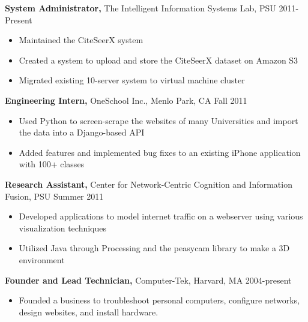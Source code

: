 \documentclass[margin]{res}
\begin{document}
\begin{resume}
{\bf System Administrator,} The Intelligent Information Systems Lab, PSU \hfill 2011-Present
\begin{itemize} \itemsep -2pt  %
\item Maintained the CiteSeerX system 
\item Created a system to upload and store the CiteSeerX dataset on Amazon S3
\item Migrated existing 10-server system to virtual machine cluster 
\end{itemize}
 
{\bf Engineering Intern,} OneSchool Inc., Menlo Park, CA \hfill Fall 2011
\begin{itemize} \itemsep -2pt %
\item Used Python to screen-scrape the websites of many Universities and import the data into a Django-based API
\item Added features and implemented bug fixes to an existing iPhone application with 100+ classes
\end{itemize}

{\bf Research Assistant,} Center for Network-Centric Cognition and Information Fusion, PSU \hfill Summer 2011
\begin{itemize} \itemsep -2pt
\item Developed applications to model internet traffic on a webserver using various visualization techniques 
\item Utilized Java through Processing and the peasycam library to make a 3D environment
\end{itemize}

{\bf Founder and Lead Technician,} Computer-Tek, Harvard, MA \hfill 2004-present
\begin{itemize} \itemsep -2pt
\item Founded a business to troubleshoot personal computers, configure networks, design websites, and install hardware.
\end{itemize}


\end{resume}
\end{document}
